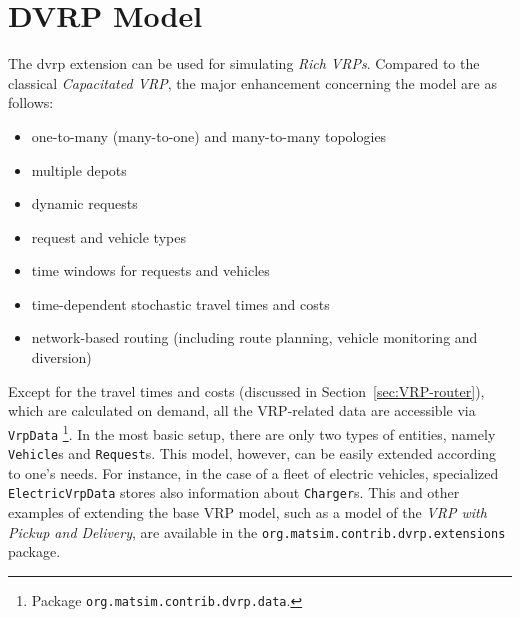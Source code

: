 \section{DVRP Model}
\label{sec:DVRP_model}
The \gls{dvrp} extension can be used for simulating \emph{Rich VRPs}. Compared to the classical \emph{Capacitated VRP}, the major enhancement concerning the model are as follows:
%
\begin{itemize}
	\item one-to-many (many-to-one) and many-to-many topologies
	\item multiple depots
	\item dynamic requests
	\item request and vehicle types
	\item time windows for requests and vehicles
	\item time-dependent stochastic travel times and costs
	\item network-based routing (including route planning, vehicle monitoring and diversion)
\end{itemize}
%
Except for the travel times and costs (discussed in Section~\ref{sec:VRP-router}), which are calculated on demand, all the VRP-related data are accessible via \lstinline$VrpData$%
\footnote{
Package \lstinline$org.matsim.contrib.dvrp.data$.
}.
In the most basic setup, there are only two types of entities, namely \lstinline$Vehicle$s and \lstinline$Request$s. This model, however, can be easily extended according to one's needs. For instance, in the case of a fleet of electric vehicles, specialized \lstinline$ElectricVrpData$ stores also information about \lstinline$Charger$s. This and other examples of extending the base VRP model, such as a model of the \emph{VRP with Pickup and Delivery}, are available in the \lstinline$org.matsim.contrib.dvrp.extensions$ package.

